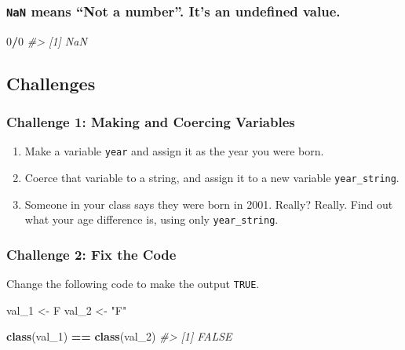 \documentclass[]{book}
\newenvironment{Shaded}{\begin{snugshade}}{\end{snugshade}}
\newcommand{\KeywordTok}[1]{\textcolor[rgb]{0.13,0.29,0.53}{\textbf{#1}}}
\newcommand{\DecValTok}[1]{\textcolor[rgb]{0.00,0.00,0.81}{#1}}
\newcommand{\StringTok}[1]{\textcolor[rgb]{0.31,0.60,0.02}{#1}}
\newcommand{\CommentTok}[1]{\textcolor[rgb]{0.56,0.35,0.01}{\textit{#1}}}
\newcommand{\OperatorTok}[1]{\textcolor[rgb]{0.81,0.36,0.00}{\textbf{#1}}}
\newcommand{\NormalTok}[1]{#1}
\providecommand{\tightlist}{%
  \setlength{\itemsep}{0pt}\setlength{\parskip}{0pt}}
\begin{document}
\subsubsection*{\texorpdfstring{\texttt{NaN} means ``Not a number''.
It's an undefined
value.}{NaN means Not a number. It's an undefined value.}}\label{nan-means-not-a-number.-its-an-undefined-value.}

\begin{Shaded}
\begin{Highlighting}[]
\DecValTok{0}\OperatorTok{/}\DecValTok{0}
\CommentTok{#> [1] NaN}
\end{Highlighting}
\end{Shaded}

\subsection{Challenges}\label{challenges-4}

\subsubsection*{Challenge 1: Making and Coercing
Variables}\label{challenge-1-making-and-coercing-variables}

\begin{enumerate}
\def\labelenumi{\arabic{enumi}.}
\tightlist
\item
  Make a variable \texttt{year} and assign it as the year you were born.
\item
  Coerce that variable to a string, and assign it to a new variable
  \texttt{year\_string}.
\item
  Someone in your class says they were born in 2001. Really? Really.
  Find out what your age difference is, using only
  \texttt{year\_string}.
\end{enumerate}

\subsubsection*{Challenge 2: Fix the
Code}\label{challenge-2-fix-the-code}

Change the following code to make the output \texttt{TRUE}.

\begin{Shaded}
\begin{Highlighting}[]
\NormalTok{val_}\DecValTok{1}\NormalTok{ <-}\StringTok{ }\NormalTok{F}
\NormalTok{val_}\DecValTok{2}\NormalTok{ <-}\StringTok{ "F"}

\KeywordTok{class}\NormalTok{(val_}\DecValTok{1}\NormalTok{) }\OperatorTok{==}\StringTok{ }\KeywordTok{class}\NormalTok{(val_}\DecValTok{2}\NormalTok{)}
\CommentTok{#> [1] FALSE}
\end{Highlighting}
\end{Shaded}
\end{document}
